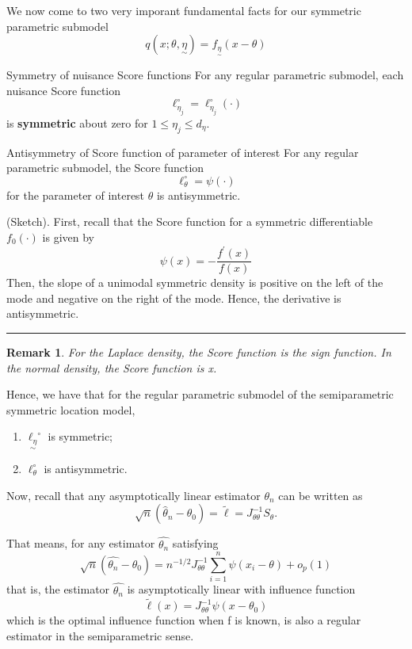 \documentclass[twoside]{article}
\newtheorem{remark}[theorem]{Remark}
\newenvironment{proof}{{\bf Proof:}}{\hfill\rule{2mm}{2mm}}
\newcommand{\utilde}{\underset{\sim}}
\begin{document}
We now come to two very imporant fundamental facts for our symmetric parametric submodel  
$$
q(x; \theta, \utilde{\eta}) = f_{\utilde{\eta}}(x - \theta)
$$

\begin{proposition_exam}{Symmetry of nuisance Score functions}{} For any regular parametric submodel, each nuisance Score function 
$$
\ell_{\eta_{j}}^{\circ} = \ell_{\eta_{j}}^{\circ}(\cdot)
$$
is \textbf{symmetric} about zero for $1 \leq \eta_j \leq d_{\eta}.$
\end{proposition_exam}


\begin{proposition_exam}{Antisymmetry of Score function of parameter of interest}{} For any regular parametric submodel, the Score function 
$$
\ell_{\theta}^{\circ} = \psi(\cdot)
$$ for the parameter of interest $\theta$ is antisymmetric.
\end{proposition_exam}

\begin{proof}(Sketch). First, recall that the Score function for a symmetric differentiable $f_0(\cdot)$ is given by 
$$
\psi(x) = -\frac{f^{'}(x)}{f(x)}
$$
Then, the slope of a unimodal symmetric density is positive on the left of the mode and negative on the right of the mode. Hence, the derivative is antisymmetric.
\end{proof}
\begin{remark}
For the Laplace density, the Score function is the sign function. In the normal density, the Score function is x. 
\end{remark}

Hence, we have that for the regular parametric submodel of the semiparametric symmetric location model, 
\begin{enumerate}
  \item $\utilde{\ell_{\eta}}^{\circ}$ is symmetric;
  \item $\ell_{\theta}^{\circ}$ is antisymmetric.
\end{enumerate}

Now, recall that any asymptotically linear estimator $\hat{\theta_n}$ can be written as 
$$
\sqrt{n}(\hat{\theta}_n - \theta_0) = \tilde{\ell} = J_{\theta \theta}^{-1}S_{\theta}.
$$

That means, for any estimator $\hat{\theta_{n}}$ satisfying 
$$
\sqrt{n}(\hat{\theta_{n}} - \theta_0) = n^{-1/2}J_{\theta \theta}^{-1}\sum_{i=1}^{n}\psi(x_i - \theta) + o_p(1)
$$
that is, the estimator $\hat{\theta_{n}}$ is asymptotically linear with influence function 
$$
\tilde{\ell}(x) = J_{\theta \theta}^{-1}\psi(x - \theta_0)
$$
which is the optimal influence function when f is known, is also a regular estimator in the semiparametric sense.
\end{document}
